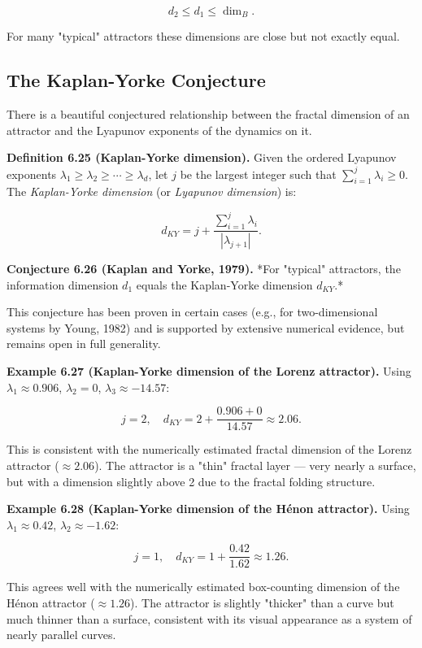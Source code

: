 \[
d_2 \leq d_1 \leq \dim_B.
\]

For many "typical" attractors these dimensions are close but not exactly equal.

\subsection{The Kaplan-Yorke Conjecture}\label{sec:6.5.4}

There is a beautiful conjectured relationship between the fractal dimension of an attractor and the Lyapunov exponents of the dynamics on it.

\textbf{Definition 6.25 (Kaplan-Yorke dimension).} Given the ordered Lyapunov exponents $\lambda_1 \geq \lambda_2 \geq \cdots \geq \lambda_d$, let $j$ be the largest integer such that $\sum_{i=1}^j \lambda_i \geq 0$. The \textit{Kaplan-Yorke dimension} (or \textit{Lyapunov dimension}) is:

\[
d_{KY} = j + \frac{\sum_{i=1}^j \lambda_i}{|\lambda_{j+1}|}.
\]

\textbf{Conjecture 6.26 (Kaplan and Yorke, 1979).} *For "typical" attractors, the information dimension $d_1$ equals the Kaplan-Yorke dimension $d_{KY}$.*

This conjecture has been proven in certain cases (e.g., for two-dimensional systems by Young, 1982) and is supported by extensive numerical evidence, but remains open in full generality.

\textbf{Example 6.27 (Kaplan-Yorke dimension of the Lorenz attractor).} Using $\lambda_1 \approx 0.906$, $\lambda_2 = 0$, $\lambda_3 \approx -14.57$:

\[
j = 2, \quad d_{KY} = 2 + \frac{0.906 + 0}{14.57} \approx 2.06.
\]

This is consistent with the numerically estimated fractal dimension of the Lorenz attractor ($\approx 2.06$). The attractor is a "thin" fractal layer --- very nearly a surface, but with a dimension slightly above 2 due to the fractal folding structure.

\textbf{Example 6.28 (Kaplan-Yorke dimension of the Hénon attractor).} Using $\lambda_1 \approx 0.42$, $\lambda_2 \approx -1.62$:

\[
j = 1, \quad d_{KY} = 1 + \frac{0.42}{1.62} \approx 1.26.
\]

This agrees well with the numerically estimated box-counting dimension of the Hénon attractor ($\approx 1.26$). The attractor is slightly "thicker" than a curve but much thinner than a surface, consistent with its visual appearance as a system of nearly parallel curves.


